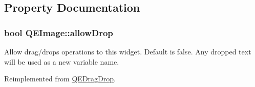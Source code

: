 \subsection{Property Documentation}
\hypertarget{classQEImage_abf2d95e9f4cb90d78ab42ca530ca64df}{
\subsubsection[{allowDrop}]{\setlength{\rightskip}{0pt plus 5cm}bool QEImage::allowDrop}}
\label{classQEImage_abf2d95e9f4cb90d78ab42ca530ca64df}
Allow drag/drops operations to this widget. Default is false. Any dropped text will be used as a new variable name. 

Reimplemented from \hyperlink{classQEDragDrop}{QEDragDrop}.

